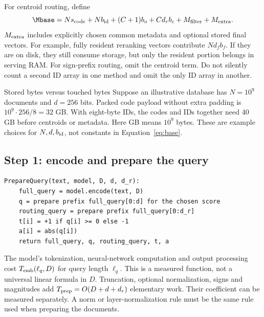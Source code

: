 For centroid routing, define
\begin{equation}
\Mbase=N s_{\rm code}+N b_{\rm id}+(C+1)b_o+C d_r b_c+M_{\rm filter}+M_{\rm extra}.
\label{eq:base}
\end{equation}
$M_{\rm extra}$ includes explicitly chosen common metadata and optional stored final vectors.
For example, fully resident reranking vectors contribute $N d_f b_f$. If they are on disk,
they still consume storage, but only the resident portion belongs in serving RAM. For
sign-prefix routing, omit the centroid term. Do not silently count a second ID array in one
method and omit the only ID array in another.

\begin{examplebox}{Stored bytes versus touched bytes}
Suppose an illustrative database has $N=10^9$ documents and $d=256$ bits. Packed code payload
without extra padding is $10^9\cdot256/8=32$ GB. With eight-byte IDs, the codes and IDs together
need 40 GB before centroids or metadata. Here GB means $10^9$ bytes. These are example choices
for $N,d,b_{\rm id}$, not constants in Equation~\eqref{eq:base}.
\end{examplebox}

\subsection{Step 1: encode and prepare the query}
\par\noindent\begin{minipage}{\linewidth}
\begin{lstlisting}[caption={Query preparation shared by all methods.}]
PrepareQuery(text, model, D, d, d_r):
    full_query = model.encode(text, D)
    q = prepare prefix full_query[0:d] for the chosen score
    routing_query = prepare prefix full_query[0:d_r]
    t[i] = +1 if q[i] >= 0 else -1
    a[i] = abs(q[i])
    return full_query, q, routing_query, t, a
\end{lstlisting}
\end{minipage}\par
The model's tokenization, neural-network computation and output processing cost
$T_{\rm emb}(\ell_q,D)$ for query length $\ell_q$. This is a measured function, not a universal
linear formula in $D$. Truncation, optional normalization, signs and magnitudes add
$T_{\rm prep}=O(D+d+d_r)$ elementary work. Their coefficient can be measured separately.
A norm or layer-normalization rule must be the same rule used when preparing the documents.


